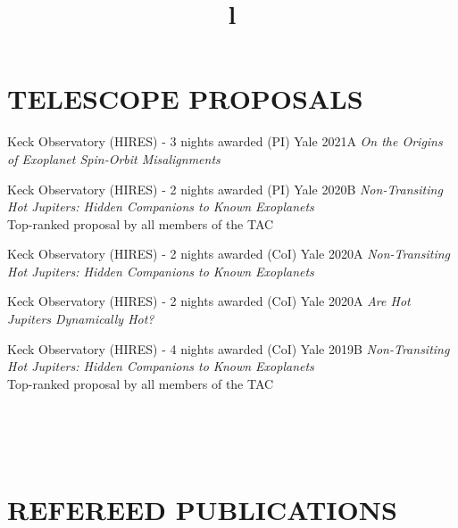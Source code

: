 \documentclass[margin]{res}
\begin{document}
\begin{resume}
\section{\normalfont TELESCOPE PROPOSALS}
Keck Observatory (HIRES) - 3 nights awarded (PI) \hfill Yale 2021A\newline
\textit{On the Origins of Exoplanet Spin-Orbit Misalignments}

Keck Observatory (HIRES) - 2 nights awarded (PI) \hfill Yale 2020B\newline
\textit{Non-Transiting Hot Jupiters: Hidden Companions to Known Exoplanets}\\
{Top-ranked proposal by all members of the TAC}

Keck Observatory (HIRES) - 2 nights awarded (CoI) \hfill Yale 2020A\newline
\textit{Non-Transiting Hot Jupiters: Hidden Companions to Known Exoplanets}

Keck Observatory (HIRES) - 2 nights awarded (CoI) \hfill Yale 2020A \newline
\textit{Are Hot Jupiters Dynamically Hot?}

Keck Observatory (HIRES) - 4 nights awarded (CoI) \hfill Yale 2019B \newline
\textit{Non-Transiting Hot Jupiters: Hidden Companions to Known Exoplanets}\\
{Top-ranked proposal by all members of the TAC}

\begin{format}
\title{l}\\
\\
\body\\
\end{format}

\section{\normalfont REFEREED PUBLICATIONS}


\end{resume}
\end{document}
